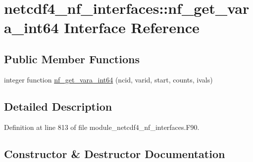 \hypertarget{interfacenetcdf4__nf__interfaces_1_1nf__get__vara__int64}{}\section{netcdf4\+\_\+nf\+\_\+interfaces\+:\+:nf\+\_\+get\+\_\+vara\+\_\+int64 Interface Reference}
\label{interfacenetcdf4__nf__interfaces_1_1nf__get__vara__int64}
\subsection*{Public Member Functions}
\begin{DoxyCompactItemize}
\item 
integer function \hyperlink{interfacenetcdf4__nf__interfaces_1_1nf__get__vara__int64_a2e83ef4e784bda61abc75066d88c5c25}{nf\+\_\+get\+\_\+vara\+\_\+int64} (ncid, varid, start, counts, ivals)
\end{DoxyCompactItemize}


\subsection{Detailed Description}


Definition at line 813 of file module\+\_\+netcdf4\+\_\+nf\+\_\+interfaces.\+F90.



\subsection{Constructor \& Destructor Documentation}
\mbox{\label{interfacenetcdf4__nf__interfaces_1_1nf__get__vara__int64_a2e83ef4e784bda61abc75066d88c5c25}} 
